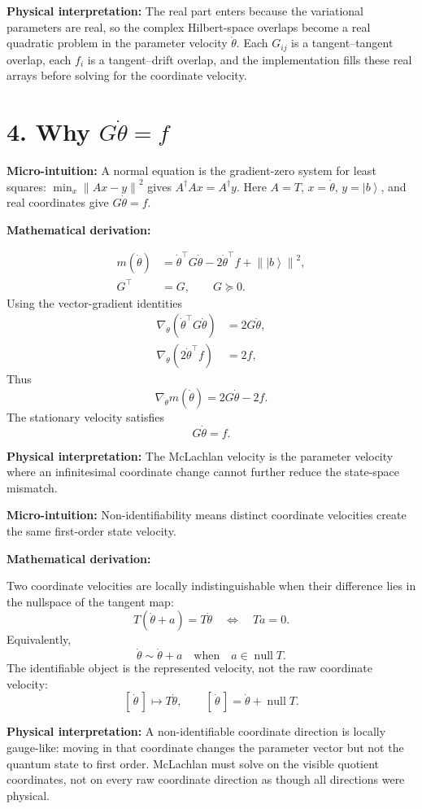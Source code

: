 \documentclass[10pt,twocolumn]{article}
\newcommand{\ket}[1]{\left|#1\right\rangle}
\newcommand{\norm}[1]{\left\lVert #1\right\rVert}
\newcommand{\micro}[1]{%
  \par\smallskip
  \noindent\textcolor{deepblue}{\textbf{Micro-intuition:}} #1
  \par\smallskip}
\newcommand{\deriv}{%
  \par\noindent\textcolor{deepviolet}{\textbf{Mathematical derivation:}}\par\vspace{-1mm}}
\newcommand{\phys}[1]{%
  \par\smallskip
  \noindent\textcolor{deepgreen}{\textbf{Physical interpretation:}} #1
  \par\smallskip}
\begin{document}
\phys{The real part enters because the variational parameters are real, so the
complex Hilbert-space overlaps become a real quadratic problem in the parameter
velocity \(\dot\theta\). Each \(G_{ij}\) is a tangent--tangent overlap, each
\(f_i\) is a tangent--drift overlap, and the implementation fills these real
arrays before solving for the coordinate velocity.}

\section*{4. Why \(G\dot\theta=f\)}

\micro{A normal equation is the gradient-zero system for least squares:
\(\min_x\norm{Ax-y}^2\) gives \(A^\dagger Ax=A^\dagger y\). Here \(A=T\),
\(x=\dot\theta\), \(y=\ket b\), and real coordinates give \(G\dot\theta=f\).}

\deriv
\[
\begin{aligned}
m(\dot\theta)&=\dot\theta^\top G\dot\theta-2\dot\theta^\top f+\norm{\ket b}^2,\\
G^\top&=G,\qquad G\succeq0.
\end{aligned}
\]
Using the vector-gradient identities
\[
\begin{aligned}
\nabla_{\dot\theta}(\dot\theta^\top G\dot\theta)&=2G\dot\theta,\\
\nabla_{\dot\theta}(2\dot\theta^\top f)&=2f,
\end{aligned}
\]
Thus
\[
\nabla_{\dot\theta}m(\dot\theta)=2G\dot\theta-2f.
\]
The stationary velocity satisfies
\[
G\dot\theta=f.
\]

\phys{The McLachlan velocity is the parameter velocity where an infinitesimal
coordinate change cannot further reduce the state-space mismatch.}

\micro{Non-identifiability means distinct coordinate velocities create the same
first-order state velocity.}

\deriv
Two coordinate velocities are locally indistinguishable when their difference
lies in the nullspace of the tangent map:
\[
T(\dot\theta+a)=T\dot\theta
\quad\Longleftrightarrow\quad
Ta=0.
\]
Equivalently,
\[
\dot\theta\sim\dot\theta+a
\quad\text{when}\quad
a\in\operatorname{null}T.
\]
The identifiable object is the represented velocity, not the raw coordinate
velocity:
\[
[\,\dot\theta\,]\longmapsto T\dot\theta,
\qquad
[\,\dot\theta\,]=\dot\theta+\operatorname{null}T.
\]

\phys{A non-identifiable coordinate direction is locally gauge-like: moving in
that coordinate changes the parameter vector but not the quantum state to first
order. McLachlan must solve on the visible quotient coordinates, not on every
raw coordinate direction as though all directions were physical.}
\end{document}
